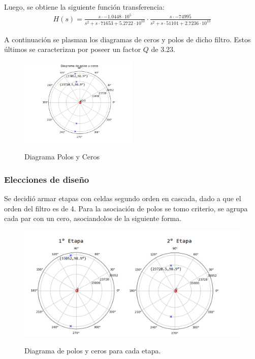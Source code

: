 Luego, se obtiene la siguiente función transferencia:
\begin{align}
	H(s)=\frac{s\cdot -1.0448\cdot 10^{5}}{s^2+s\cdot 71653+5.2722\cdot 10^{10}}\cdot \frac{s \cdot -74995}{s^2+s\cdot 51101+2.7236 \cdot 10^{10}}
\end{align}

A continuación se plasman los diagramas de ceros y polos de dicho filtro. Estos últimos se caracterizan por poseer un factor $Q$ de 3.23.
\begin{figure}[H]
	\centering
	\includegraphics[width=0.5\textwidth]{Imagenes-Ej2/DiagramaPolosYCeros.png}
	\label{fig:stepresponse}
	\caption{Diagrama Polos y Ceros}
\end{figure}

\subsubsection{Elecciones de diseño}
Se decidió armar etapas con celdas segundo orden en cascada, dado a que el orden del filtro es de 4. Para la asociación de polos se tomo criterio, se agrupa cada par con un cero, asociandolos de la siguiente forma.
\begin{figure}[H]
	\centering
	\includegraphics[width=\textwidth]{Imagenes-Ej2/UnionCeros.png}
	\label{fig:CeroPoleUnion}
	\caption{Diagrama de polos y ceros para cada etapa.}
\end{figure}

